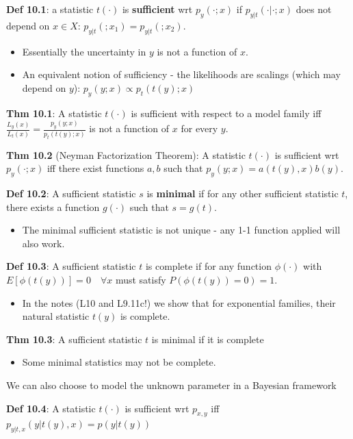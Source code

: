 \documentclass[12pt]{article} %
\begin{document}
\textbf{Def 10.1}: a statistic $t(\cdot)$ is \textbf{sufficient} wrt $p_y(\cdot;x)$ if $p_{y|t}(\cdot|\cdot;x)$ does not depend on $x \in X$: $p_{y|t}(;x_1)  = p_{y|t}(;x_2)$.
\begin{itemize}[topsep=-1pt, itemsep=-1pt]
    \item Essentially the uncertainty in $y$ is not a function of $x$.
    \item An equivalent notion of sufficiency - the likelihoods are scalings (which may depend on $y$): $p_y(y;x) \propto p_t(t(y);x)$
\end{itemize}

\textbf{Thm 10.1}: A statistic $t(\cdot)$ is sufficient with respect to a model family iff $\frac{L_y(x)}{L_t(x)} = \frac{p_y(y;x)}{p_t(t(y);x)}$ is not a function of $x$ for every $y$.

\textbf{Thm 10.2} (Neyman Factorization Theorem): A statistic $t(\cdot)$ is sufficient wrt $p_y(\cdot;x)$ iff there exist functions $a,b$ such that $p_y(y;x) = a(t(y),x) b(y)$.

\textbf{Def 10.2}: A sufficient statistic $s$ is \textbf{minimal} if for any other sufficient statistic $t$, there exists a function $g(\cdot)$ such that $s = g(t)$.
\begin{itemize}[topsep=-1pt, itemsep=-1pt]
    \item The minimal sufficient statistic is not unique - any 1-1 function applied will also work.
\end{itemize}

\textbf{Def 10.3}: A sufficient statistic $t$ is complete if for any function $\phi(\cdot)$ with $E[\phi(t(y))] = 0 \quad \forall x$ must satisfy $P(\phi(t(y)) = 0) = 1$.
\begin{itemize}[topsep=-1pt, itemsep=-1pt]
    \item In the notes (L10 and L9.11c!) we show that for exponential families, their natural statistic $t(y)$ is complete.
\end{itemize}
\textbf{Thm 10.3}: A sufficient statistic $t$ is minimal if it is complete
\begin{itemize}[topsep=-1pt, itemsep=-1pt]
    \item Some minimal statistics may not be complete.
\end{itemize}
\separate
We can also choose to model the unknown parameter in a Bayesian framework

\textbf{Def 10.4}: A statistic $t(\cdot)$ is sufficient wrt $p_{x,y}$ iff $p_{y|t,x}(y|t(y),x) = p(y|t(y))$
\end{document}
